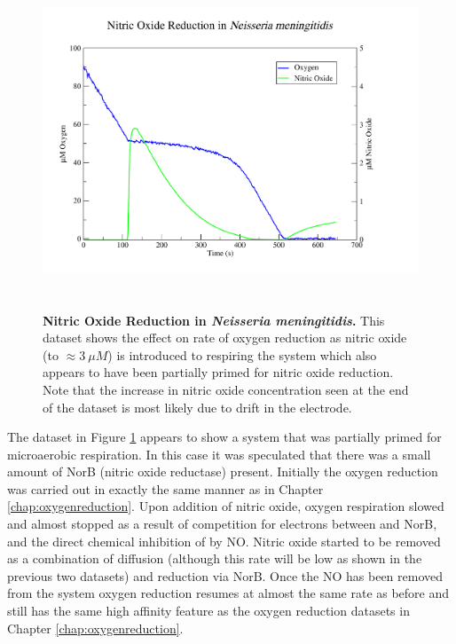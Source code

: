 \begin{figure}[tbp]
 \centering
 \includegraphics[height=10cm, trim=2cm 1cm 4cm 1cm]{./06-noreduction/data/aer-no-data.pdf}
 \caption[{Nitric Oxide Reduction in \textit{Neisseria meningitidis}.}]{{\bf Nitric Oxide Reduction in \textit{Neisseria meningitidis}.} This dataset shows the effect on rate of oxygen reduction as nitric oxide (to $\approx 3~\mu M$) is introduced to respiring the system which also appears to have been partially primed for nitric oxide reduction. Note that the increase in nitric oxide concentration seen at the end of the dataset is most likely due to drift in the electrode.}
 \label{fig:nodata}
\end{figure}
The dataset in Figure \ref{fig:nodata} appears to show a system that was partially primed for microaerobic respiration. In this case it was speculated that there was a small amount of NorB (nitric oxide reductase) present. Initially the oxygen reduction was carried out in exactly the same manner as in Chapter \ref{chap:oxygenreduction}. Upon addition of nitric oxide, oxygen respiration slowed and almost stopped as a result of competition for electrons between \cbbthree{} and NorB, and the direct chemical inhibition of \cbbthree{} by NO. Nitric oxide started to be removed as a combination of diffusion (although this rate will be low as shown in the previous two datasets) and reduction via NorB. Once the NO has been removed from the system oxygen reduction resumes at almost the same rate as before and still has the same high affinity feature as the oxygen reduction datasets in Chapter \ref{chap:oxygenreduction}.

